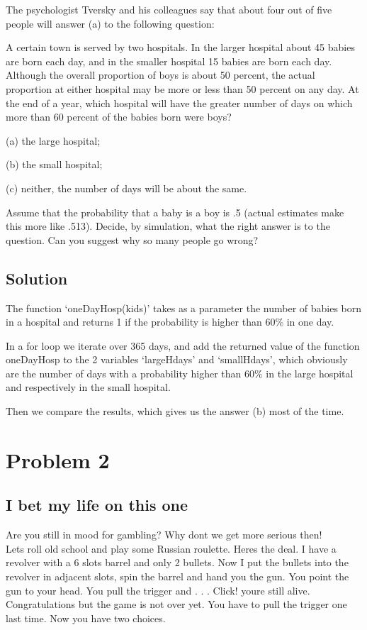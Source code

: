 \documentclass{article}
\begin{document}
    The psychologist Tversky and his colleagues say that about four out of five
    people will answer (a) to the following question:

    A certain town is served by two hospitals. In the larger hospital about 45
    babies are born each day, and in the smaller hospital 15 babies are born each
    day. Although the overall proportion of boys is about 50 percent, the actual
    proportion at either hospital may be more or less than 50 percent on any day.
    At the end of a year, which hospital will have the greater number of days on
    which more than 60 percent of the babies born were boys?

    (a) the large hospital;

    (b) the small hospital;

    (c) neither, the number of days will be about the same.

    Assume that the probability that a baby is a boy is .5 (actual estimates
    make this more like .513). Decide, by simulation, what the right answer is to
    the question. Can you suggest why so many people go wrong?
    \subsection{Solution}
    The function `oneDayHosp(kids)' takes as a
    parameter the number of babies born in a hospital and returns 1 if the
    probability is higher than 60\% in one day.

    In a for loop we iterate over 365 days, and add the returned value of the
    function oneDayHosp to the 2 variables
    `largeHdays' and `smallHdays', which obviously are the number of days with
    a probability higher than 60\% in the large hospital and respectively in
    the small hospital.

    Then we compare the results, which gives us the answer (b) most of the time.

  \newpage

  \section{Problem 2}

    \subsection{I bet my life on this one}

    \hspace{6mm}Are you still in mood for gambling? Why don\textquotesingle t
    we get more serious then!\\Let\textquotesingle s roll old school and play
    some Russian roulette. Here\textquotesingle s the deal. I have a revolver
    with a 6 slots barrel and only 2 bullets. Now I put the bullets into the
    revolver in adjacent slots, spin the barrel and hand you the gun. You point
    the gun to your head. You pull the trigger and . . . Click!
    you\textquotesingle re still alive. Congratulations but the game is not
    over yet. You have to pull the trigger one last time.
    Now you have two choices.
\end{document}
